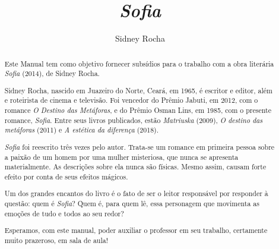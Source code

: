 \documentclass[12pt]{extarticle}
\begin{document}
\newcommand{\AutorLivro}{Sidney Rocha}
\newcommand{\TituloLivro}{\textit{Sofia}}
\newcommand{\Tema}{Ficção, mistério e fantasia}
\newcommand{\Genero}{Romance}
\newcommand{\imagemCapa}{./images/PNLD0054-01.png}
\newcommand{\issnppub}{---}
\newcommand{\issnepub}{---}
\newcommand{\colaborador}{Vicente Castro e Reniêr Cândido de Vasconcelos Silva}


\title{\TituloLivro} \author{\AutorLivro} \def\authornotes{\colaborador}

\date{} \maketitle

\baselineskip\par

\begin{abstract}

Este Manual tem como objetivo fornecer subsídios para o trabalho com a obra
  literária \textit{Sofia} (2014), de Sidney Rocha.

Sidney Rocha, nascido em Juazeiro do Norte, Ceará, em 1965, é escritor e
  editor, além e roteirista de cinema e televisão. 
  Foi vencedor do Prêmio Jabuti, em
  2012, com o romance \textit{O Destino das Metáforas}, e do Prêmio Osman Lins,
  em 1985, com o presente romance, \textit{Sofia}. Entre 
  seus livros publicados, estão 
  \textit{Matriuska} (2009), 
  \textit{O destino das metáforas} (2011) e
  \textit{A estética da diferença} (2018).


\textit{Sofia} foi reescrito três vezes pelo autor. Trata-se um romance
  em primeira pessoa sobre a paixão de um homem por uma mulher misteriosa, 
  que nunca se apresenta materialmente. As descrições sobre ela nunca são físicas.
  Mesmo assim, causam forte efeito por conta de seus efeitos mágicos. 

Um dos grandes encantos do livro é o fato de ser o
  leitor responsável por responder à questão: quem é \textit{Sofia}? Quem é, para quem
  lê, essa personagem que movimenta as emoções de tudo e todos ao seu redor?

Esperamos, com este manual, poder auxiliar o professor em seu trabalho,
  certamente muito prazeroso, em sala de aula!


\end{abstract}

\tableofcontents
\end{document}
